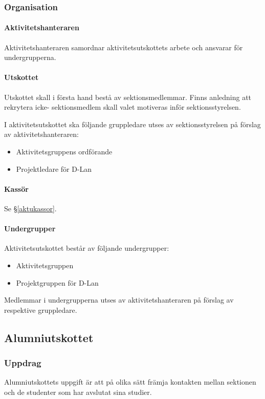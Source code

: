 \documentclass{datateknologsektionen-document}
\begin{document}
\subsubsection{Organisation}
\paragraph{Aktivitetshanteraren}
Aktivitetshanteraren samordnar aktivitetsutskottets arbete och ansvarar för undergrupperna.
\paragraph{Utskottet}

Utskottet skall i första hand bestå av sektionsmedlemmar. Finns anledning att rekrytera icke-
sektionsmedlem skall valet motiveras inför sektionsstyrelsen.

I aktivitetsutskottet ska följande gruppledare utses av sektionsstyrelsen på förslag
av aktivitetshanteraren:
\begin{itemize}
  \item Aktivitetsgruppens ordförande
  \item Projektledare för D-Lan
\end{itemize}

\paragraph{Kassör}
Se \S \ref{aktukassor}.

\paragraph{Undergrupper}
Aktivitetsutskottet består av följande undergrupper:
\begin{itemize}
  \item Aktivitetsgruppen
  \item Projektgruppen för D-Lan
\end{itemize}
Medlemmar i undergrupperna utses av aktivitetshanteraren på förslag av respektive gruppledare.

\subsection{Alumniutskottet}
\label{alumni}
\subsubsection{Uppdrag}
Alumniutskottets uppgift är att på olika sätt främja kontakten mellan
sektionen och de studenter som har avslutat sina studier.
\end{document}

